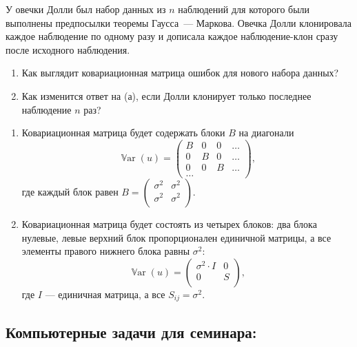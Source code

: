 \documentclass[12pt]{article}
\DeclareMathOperator{\Var}{\mathbb{V}ar}
\begin{document}
\begin{problem}
У овечки Долли был набор данных из $n$ наблюдений для которого были выполнены предпосылки теоремы Гаусса~— Маркова. 
Овечка Долли клонировала каждое наблюдение по одному разу и дописала каждое наблюдение-клон сразу после исходного наблюдения. 

\begin{enumerate}
  \item Как выглядит ковариационная матрица ошибок для нового набора данных?
  \item Как изменится ответ на (а), если Долли клонирует только последнее наблюдение $n$ раз?
\end{enumerate}
\begin{sol}
    \begin{enumerate}
        \item Ковариационная матрица будет содержать блоки $B$ на диагонали
\[
\Var(u) = \begin{pmatrix}
            B & 0 & 0 & \dots \\
            0 & B & 0 & \dots \\
            0 & 0 & B & \dots \\
            \dots
        \end{pmatrix},
\]
где каждый блок равен $B = \begin{pmatrix}
    \sigma^2 & \sigma^2 \\
    \sigma^2 & \sigma^2 \\    
\end{pmatrix}$.
        \item Ковариационная матрица будет состоять из четырех блоков: два блока нулевые, левые верхний блок пропорционален единичной матрицы, 
        а все элементы правого нижнего блока равны $\sigma^2$:
\[
\Var(u) = \begin{pmatrix}
            \sigma^2 \cdot I & 0 \\
            0 & S \\
        \end{pmatrix},
\]
где $I$ — единичная матрица, а все $S_{ij} = \sigma^2$.
    \end{enumerate}
\end{sol}
\end{problem}



\subsection{Компьютерные задачи для семинара:}
\end{document}

